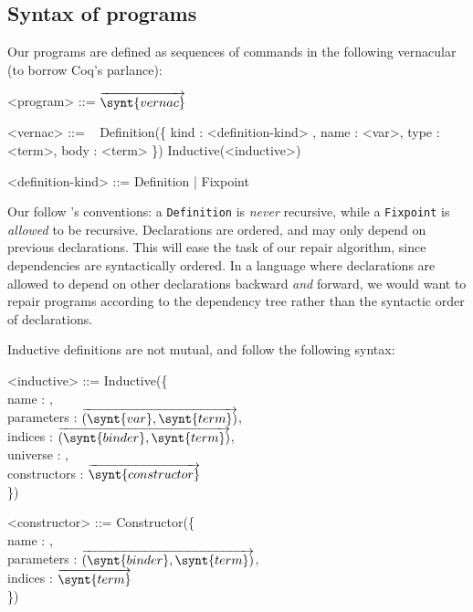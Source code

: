 \subsection{Syntax of programs}\label{chick-design-syntax-programs}

Our programs are defined as sequences of commands in the following vernacular
(to borrow Coq's parlance):

\begin{grammar}
<program> ::= $\overrightarrow{ \synt{vernac} }$

<vernac> ::= \ %
\alt Definition(\{ kind : <definition-kind> , name : <var>, type : <term>, body : <term> \})
\alt Inductive(<inductive>)

<definition-kind> ::= Definition | Fixpoint
\end{grammar}

Our  follow \Coq{}'s \Vernacular{} conventions: a
\texttt{Definition} is \emph{never} recursive, while a
\texttt{Fixpoint} is \emph{allowed} to be recursive.  Declarations are
ordered, and may only depend on previous declarations.  This will ease the task
of our repair algorithm, since dependencies are syntactically ordered.  In a
language where declarations are allowed to depend on other declarations backward
\emph{and} forward, we would want to repair programs according to the dependency
tree rather than the syntactic order of declarations.

Inductive definitions are not mutual, and follow the following syntax:

\noindent
\begin{grammar}
<inductive> ::= Inductive(\{\\
name : ,\\
parameters : $\overrightarrow{ ( \synt{var} , \synt{term} ) }$,\\
indices : $\overrightarrow{ ( \synt{binder} , \synt{term} ) }$,\\
universe : ,\\
constructors : $\overrightarrow{ \synt{constructor} }$\\
\})

<constructor> ::= Constructor(\{\\
name : ,\\
parameters : $\overrightarrow{ ( \synt{binder}, \synt{term} ) }$,\\
indices : $\overrightarrow{ \synt{term} }$\\
\})
\end{grammar}
\vspace{\baselineskip}
